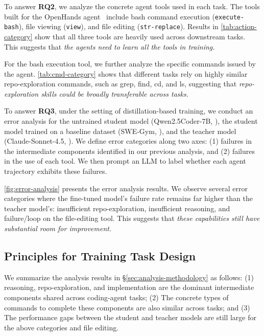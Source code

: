 \documentclass{article}
\theoremstyle{plain}
\theoremstyle{definition}
\theoremstyle{remark}
\begin{document}
To answer \textbf{RQ2}, we analyze the concrete agent tools used in each task. 
The tools built for the OpenHands agent~\cite{openhands} include bash command execution (\texttt{execute-bash}), file viewing (\texttt{view}), and file editing (\texttt{str-replace}).
Results in \autoref{tab:action-category} show that all three tools are heavily used across downstream tasks. This suggests that \emph{the agents need to learn all the tools in training.}

For the bash execution tool, we further analyze the specific commands issued by the agent. \autoref{tab:cmd-category} shows that different tasks rely on highly similar repo-exploration commands, such as grep, find, cd, and ls, suggesting that \emph{repo-exploration skills could be broadly transferable across tasks.}


To answer \textbf{RQ3}, under the setting of distillation-based training, we conduct an error analysis for the untrained student model (Qwen2.5Coder-7B, \citet{qwen25coder}), the student model trained on a baseline dataset (SWE-Gym, \citet{swegym}), and the teacher model (Claude-Sonnet-4.5, \citet{claude45}).
We define error categories along two axes: (1) failures in the intermediate components identified in our previous analysis, and (2) failures in the use of each tool.
We then prompt an LLM to label whether each agent trajectory exhibits these failures.


\autoref{fig:error-analysis} presents the error analysis results.
We observe several error categories where the fine-tuned model’s failure rate remains far higher than the teacher model’s: insufficient repo-exploration, insufficient reasoning, and failure/loop on the file-editing tool.
This suggests that \emph{these capabilities still have substantial room for improvement.}





\subsection{Principles for Training Task Design}
\label{sec:principle}
We summarize the analysis results in \S\ref{sec:analysis-methodology} as follows:
(1) reasoning, repo-exploration, and implementation are the dominant intermediate components shared across coding-agent tasks;
(2) The concrete types of commands to complete these components are also similar across tasks; and
(3) The performance gaps between the student and teacher models are still large for the above categories and file editing.
\end{document}
